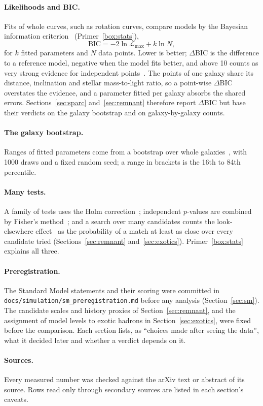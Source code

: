 \paragraph{Likelihoods and BIC.} Fits of whole curves, such as rotation curves, compare models by the Bayesian information
criterion~\cite{schwarz1978} (Primer~\ref{box:stats}),
\begin{equation}\label{eq:bic}
\mathrm{BIC}=-2\ln\mathcal L_{\max}+k\ln N ,
\end{equation}
for $k$ fitted parameters and $N$ data points. Lower is better; $\Delta$BIC is the difference to a reference model, negative when the model
fits better, and above 10 counts as very strong evidence for independent points~\cite{kassraftery1995}. The points of one galaxy share its
distance, inclination and stellar mass-to-light ratio, so a point-wise $\Delta$BIC overstates the evidence, and a parameter fitted per
galaxy absorbs the shared errors. Sections~\ref{sec:sparc} and~\ref{sec:remnant} therefore report $\Delta$BIC but base their verdicts on
the galaxy bootstrap and on galaxy-by-galaxy counts.

\paragraph{The galaxy bootstrap.} Ranges of fitted parameters come from a bootstrap over whole galaxies~\cite{efron1979}, with 1000 draws
and a fixed random seed; a range in brackets is the 16th to 84th percentile.

\paragraph{Many tests.} A family of tests uses the Holm correction~\cite{holm1979}; independent $p$-values are combined by Fisher's
method~\cite{fisher1932}; and a search over many candidates counts the look-elsewhere effect~\cite{grossvitells2010} as the probability of
a match at least as close over every candidate tried (Sections~\ref{sec:remnant} and~\ref{sec:exotics}). Primer~\ref{box:stats} explains
all three.

\paragraph{Preregistration.} The Standard Model statements and
their scoring were committed in \texttt{docs/\allowbreak simulation/\allowbreak sm\_preregistration.md} before any analysis (Section~\ref{sec:sm}). The candidate
scales and history proxies of Section~\ref{sec:remnant}, and the assignment of model levels to exotic hadrons in Section~\ref{sec:exotics},
were fixed before the comparison. Each section lists, as ``choices made after seeing the data'', what it decided later and whether a verdict
depends on it.

\paragraph{Sources.} Every measured number was checked against the arXiv text or abstract of its source. Rows read only through secondary
sources are listed in each section's caveats.
